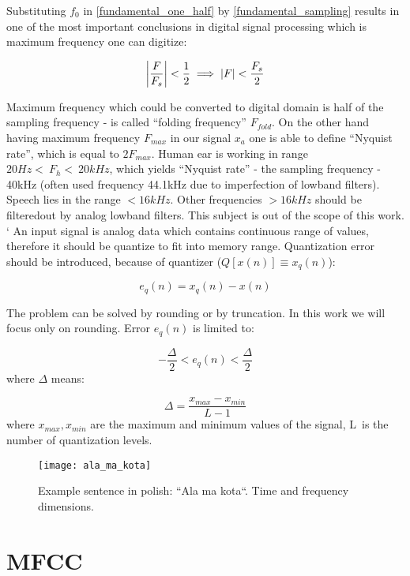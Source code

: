 Substituting $f_0$ in \eqref{fundamental_one_half} by \eqref{fundamental_sampling} results in one of the most important conclusions in digital signal processing which is maximum frequency one can digitize:

\begin{equation}
	\abs*{\frac{F}{F_s}} < \frac{1}{2} \implies \abs{F} < \frac{F_s}{2}
\end{equation}
 

Maximum frequency which could be converted to digital domain is half of the sampling frequency - is called ``folding frequency'' $F_{fold}$. On the other hand having maximum frequency $F_{max}$ in our signal $x_a$ one is able to define ``Nyquist rate'', which is equal to $2 F_{max}$. Human ear is working in range $20 Hz <~F_h <~20kHz$, which yields ``Nyquist rate'' - the sampling frequency - 40kHz (often used frequency 44.1kHz due to imperfection of low\dywiz band filters). Speech lies in the range $< 16kHz$. Other frequencies $> 16kHz$ should be filtered\dywiz out by analog low\dywiz band filters. This subject is out of the scope of this work. 
`
An input signal is analog data which contains continuous range of values, therefore it should be quantize to fit into memory range. Quantization error should be introduced, because of quantizer ($Q[x(n)] \equiv x_q(n)$):

\begin{equation}
e_q(n) = x_q(n) - x(n)
\end{equation}

The problem can be solved by rounding or by truncation. In this work we will focus only on rounding. Error $e_q(n)$ is limited to:


\begin{equation}
	-\frac{\Delta}{2} < e_q(n) < \frac{\Delta}{2}
\end{equation}
where $\Delta$ means:

\begin{equation}
	\Delta = \frac{x_{max}-x_{min}}{L-1}
\end{equation}
where $x_{max}, x_{min}$ are the maximum and minimum values of the signal, L~is the number of quantization levels.

\begin{figure}[h]
\label{f:ala_ma_kota}
\texttt{[image: ala\_ma\_kota]}
\caption{Example sentence in polish: ``Ala ma kota``. Time and frequency dimensions.}
\end{figure}

\section{MFCC}

